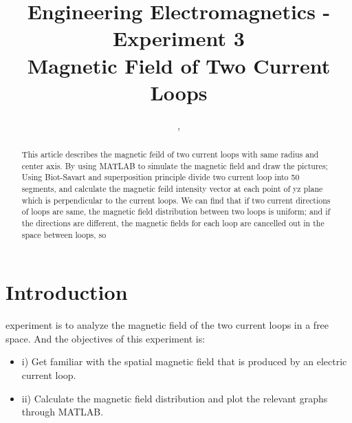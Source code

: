 \documentclass[10pt, journal, final]{IEEEtran}
\begin{document}
\title{Engineering Electromagnetics - Experiment 3\\ Magnetic Field of Two Current Loops}
\author{,
    \\
}

\maketitle

\begin{abstract}
    This article describes the magnetic feild of two current loops with same radius and center axis.
    By using MATLAB to simulate the magnetic field and draw the pictures; Using Biot-Savart and superposition principle
    divide two current loop into 50 segments, and calculate the magnetic feild intensity vector at each point of
    yz plane which is perpendicular to the current loops. We can find that if two current directions of loops are same,
    the magnetic field distribution between two loops is uniform; and if the directions are different, 
    the magnetic fields for each loop are cancelled out in the space between loops, so 

    
\end{abstract}

\section{
  Introduction
 }
\label{sec:Intro}

 experiment is to analyze the magnetic field of
the two current loops in a free space. And the objectives of this experiment is:
\begin{itemize}
    \item i) Get familiar with the spatial magnetic field that is produced by an electric current loop.
    \item ii) Calculate the magnetic field distribution and plot the relevant graphs through MATLAB.
\end{itemize}
\end{document}
